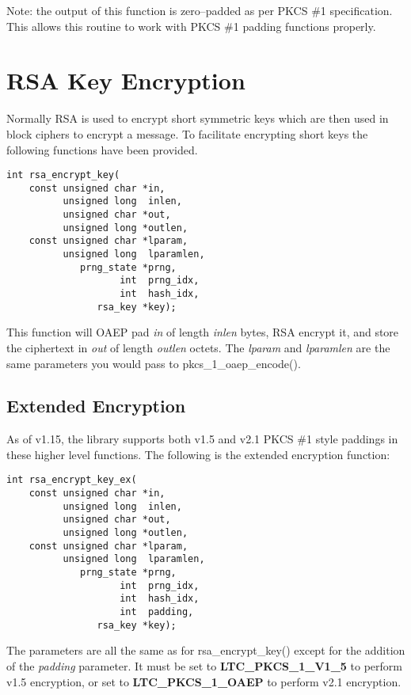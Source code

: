 \documentclass[synpaper]{book}
\newcommand{\mysection}[1]    %
	{                   %
	\section{#1}
   \markboth{\textsf{www.libtom.org}}{\thesection ~ {#1}}
	}
\begin{document}
Note: the output of this function is zero--padded as per PKCS \#1 specification.  This allows this routine to work with PKCS \#1 padding functions properly.

\mysection{RSA Key Encryption}
Normally RSA is used to encrypt short symmetric keys which are then used in block ciphers to encrypt a message.
To facilitate encrypting short keys the following functions have been provided.

\begin{verbatim}
int rsa_encrypt_key(
    const unsigned char *in,  
          unsigned long  inlen,
          unsigned char *out, 
          unsigned long *outlen,
    const unsigned char *lparam, 
          unsigned long  lparamlen,
             prng_state *prng, 
                    int  prng_idx, 
                    int  hash_idx, 
                rsa_key *key);
\end{verbatim}
This function will OAEP pad \textit{in} of length \textit{inlen} bytes, RSA encrypt it, and store the ciphertext
in \textit{out} of length \textit{outlen} octets.  The \textit{lparam} and \textit{lparamlen} are the same parameters you would pass
to  pkcs\_1\_oaep\_encode().

\subsection{Extended Encryption}
As of v1.15, the library supports both v1.5 and v2.1 PKCS \#1 style paddings in these higher level functions.  The following is the extended
encryption function:

\begin{verbatim}
int rsa_encrypt_key_ex(
    const unsigned char *in,     
          unsigned long  inlen,
          unsigned char *out,    
          unsigned long *outlen,
    const unsigned char *lparam, 
          unsigned long  lparamlen,
             prng_state *prng, 
                    int  prng_idx, 
                    int  hash_idx, 
                    int  padding, 
                rsa_key *key);
\end{verbatim}

 
The parameters are all the same as for rsa\_encrypt\_key() except for the addition of the \textit{padding} parameter.  It must be set to
\textbf{LTC\_PKCS\_1\_V1\_5} to perform v1.5 encryption, or set to \textbf{LTC\_PKCS\_1\_OAEP} to perform v2.1 encryption.
\end{document}
